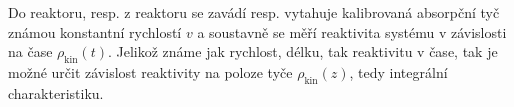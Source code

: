 Do reaktoru, resp. z reaktoru se zavádí resp. vytahuje kalibrovaná absorpční tyč známou konstantní rychlostí $v$ a soustavně se měří reaktivita systému v závislosti na čase $\rho_\text{kin}(t)$. Jelikož známe jak rychlost, délku, tak reaktivitu v čase, tak je možné určit závislost reaktivity na poloze tyče $\rho_\text{kin}(z)$, tedy integrální charakteristiku.